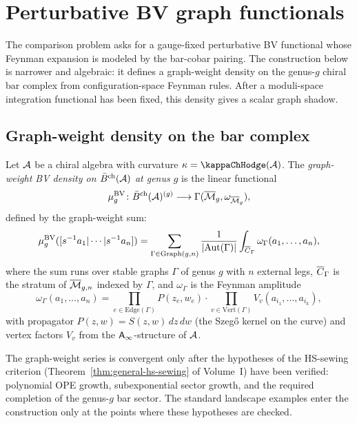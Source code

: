 \section{Perturbative BV graph functionals}

The comparison problem asks for a gauge-fixed perturbative BV
functional whose Feynman expansion is modeled by the bar-cobar pairing.
The construction below is narrower and algebraic: it defines a
graph-weight density on the genus-$g$ chiral bar complex from
configuration-space Feynman rules. After a moduli-space integration
functional has been fixed, this density gives a scalar graph shadow.

\subsection{Graph-weight density on the bar complex}

\begin{definition}
Let $\mathcal{A}$ be a chiral algebra with curvature $\kappa = \kappaChHodge(\cA)$.
The \emph{graph-weight BV density on $\bar{B}^{\mathrm{ch}}(\mathcal{A})$ at genus $g$} is the linear
functional
\[
\mu^{\mathrm{BV}}_g \colon
 \bar{B}^{\mathrm{ch}}(\mathcal{A})^{(g)} \longrightarrow
 \Gamma(\overline{\mathcal{M}}_g, \omega_{\overline{\mathcal{M}}_g}),
\]
defined by the graph-weight sum:
\[
\mu^{\mathrm{BV}}_g([s^{-1}a_1 | \cdots | s^{-1}a_n])
 = \sum_{\Gamma \in \mathrm{Graph}(g,n)}
 \frac{1}{|\mathrm{Aut}(\Gamma)|}
 \int_{\overline{C}_{\Gamma}} \omega_\Gamma(a_1, \ldots, a_n),
\]
where the sum runs over stable graphs $\Gamma$ of genus $g$ with $n$
external legs, $\overline{C}_\Gamma$ is the stratum of $\overline{\mathcal{M}}_{g,n}$
indexed by $\Gamma$, and $\omega_\Gamma$ is the Feynman amplitude
\[
\omega_\Gamma(a_1, \ldots, a_n)
 = \prod_{e \in \mathrm{Edge}(\Gamma)} P(z_e, w_e)
 \cdot \prod_{v \in \mathrm{Vert}(\Gamma)} V_v(a_{i_1}, \ldots, a_{i_k}),
\]
with propagator $P(z, w) = S(z, w) \, dz \, dw$ (the Szeg\H{o}
kernel on the curve) and vertex factors $V_v$ from the $\mathsf{A}_{\infty}$-structure
of $\mathcal{A}$.
\end{definition}

\begin{remark}[Convergence]
The graph-weight series is convergent only after the hypotheses of the
HS-sewing criterion (Theorem~\ref*{thm:general-hs-sewing} of Volume~I)
have been verified: polynomial OPE growth, subexponential sector
growth, and the required completion of the genus-$g$ bar sector. The
standard landscape examples enter the construction only at the points
where these hypotheses are checked.
\end{remark}


